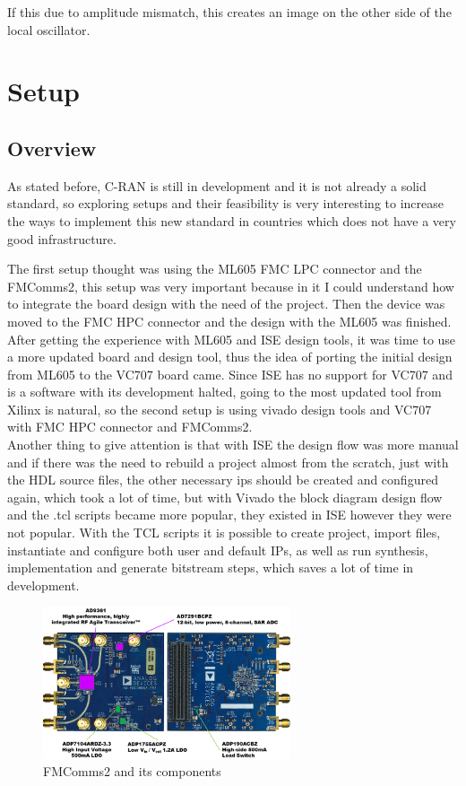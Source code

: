 If this due to amplitude mismatch, this creates an image on the other side of
the local oscillator.

\section{Setup}

\subsection{Overview}

As stated before, C-RAN is still in development and it is not already a solid
standard, so exploring setups and their feasibility is very interesting to
increase the ways to implement this new standard in countries which does not
have a very good infrastructure.

The first setup thought was using the ML605 FMC LPC connector and the FMComms2,
this setup was very important because in it I could understand how to integrate
the board design with the need of the project. Then the device was moved to the
FMC HPC connector and the design with the ML605 was finished.\\

After getting the experience with ML605 and ISE design tools, it was time to use
a more updated board and design tool, thus the idea of porting the initial
design from ML605 to the VC707 board came. Since ISE has no support for VC707
and is a software with its development halted, going to the most updated tool
from Xilinx is natural, so the second setup is using vivado design tools and
VC707 with FMC HPC connector and FMComms2.\\

Another thing to give attention is that with ISE the design flow was more manual
and if there was the need to rebuild a project almost from the scratch, just
with the HDL source files, the other necessary ips should be created and
configured again, which took a lot of time, but with Vivado the block diagram
design flow and the .tcl scripts became more popular, they existed in ISE
however they were not popular. With the TCL scripts it is possible to create
project, import files, instantiate and configure both user and default IPs, as
well as run synthesis, implementation and generate bitstream steps, which saves
a lot of time in development.\\

\begin{figure}[htbp]
    \centering
    \includegraphics[width=0.65\textwidth]{./figures/fmcomms2_pic}
    \caption{ FMComms2 and its components
    \label{fig:fmcomm}}
\end{figure}

